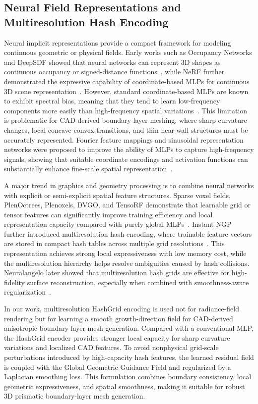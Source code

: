 \documentclass[%
 aip,
 amsmath,amssymb,
 reprint,%
nobibnotes,
]{revtex4-1}
\begin{document}
\subsection{\label{sec:rw_hashgrid}Neural Field Representations and Multiresolution Hash Encoding}
Neural implicit representations provide a compact framework for modeling continuous geometric or physical fields. Early works such as Occupancy Networks and DeepSDF showed that neural networks can represent 3D shapes as continuous occupancy or signed-distance functions~\cite{mescheder2019occupancy,park2019deepsdf}, while NeRF further demonstrated the expressive capability of coordinate-based MLPs for continuous 3D scene representation~\cite{mildenhall2020nerf}. However, standard coordinate-based MLPs are known to exhibit spectral bias, meaning that they tend to learn low-frequency components more easily than high-frequency spatial variations~\cite{rahaman2019spectral}. This limitation is problematic for CAD-derived boundary-layer meshing, where sharp curvature changes, local concave-convex transitions, and thin near-wall structures must be accurately represented. Fourier feature mappings and sinusoidal representation networks were proposed to improve the ability of MLPs to capture high-frequency signals, showing that suitable coordinate encodings and activation functions can substantially enhance fine-scale spatial representation~\cite{tancik2020fourier,sitzmann2020siren}.

A major trend in graphics and geometry processing is to combine neural networks with explicit or semi-explicit spatial feature structures. Sparse voxel fields, PlenOctrees, Plenoxels, DVGO, and TensoRF demonstrate that learnable grid or tensor features can significantly improve training efficiency and local representation capacity compared with purely global MLPs~\cite{liu2020nsvf,yu2021plenoctrees,yu2022plenoxels,sun2022dvgo,chen2022tensorf}. Instant-NGP further introduced multiresolution hash encoding, where trainable feature vectors are stored in compact hash tables across multiple grid resolutions~\cite{muller2022instantngp}. This representation achieves strong local expressiveness with low memory cost, while the multiresolution hierarchy helps resolve ambiguities caused by hash collisions. Neuralangelo later showed that multiresolution hash grids are effective for high-fidelity surface reconstruction, especially when combined with smoothness-aware regularization~\cite{li2023neuralangelo}.

In our work, multiresolution HashGrid encoding is used not for radiance-field rendering but for learning a smooth growth-direction field for CAD-derived anisotropic boundary-layer mesh generation. Compared with a conventional MLP, the HashGrid encoder provides stronger local capacity for sharp curvature variations and localized CAD features. To avoid nonphysical grid-scale perturbations introduced by high-capacity hash features, the learned residual field is coupled with the Global Geometric Guidance Field and regularized by a Laplacian smoothing loss. This formulation combines boundary consistency, local geometric expressiveness, and spatial smoothness, making it suitable for robust 3D prismatic boundary-layer mesh generation.
\end{document}
